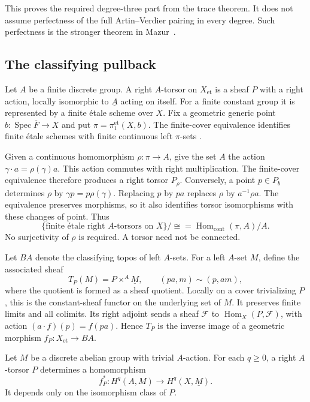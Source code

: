 This proves the required degree-three part from the trace theorem.  It
does not assume perfectness of the full Artin--Verdier pairing in every
degree.  Such perfectness is the stronger theorem in
Mazur~\cite[\S2, (2.4), pp.~538--539]{Mazur1973}.

\subsection{The classifying pullback}

Let \(A\) be a finite discrete group.  A right \(A\)-torsor on
\(X_{\mathrm{et}}\) is a sheaf \(P\) with a right action, locally
isomorphic to \(\underline A\) acting on itself.  For a finite constant
group it is represented by a finite \'etale scheme over \(X\).
Fix a geometric generic point \(b:\operatorname{Spec}\overline F\to X\)
and put \(\pi=\pi_1^{\mathrm{et}}(X,b)\).
The finite-cover equivalence identifies finite \'etale schemes with finite
continuous left \(\pi\)-sets
\cite[Theorem 58.6.2]{do26-StacksFundamental}.

Given a continuous homomorphism \(\rho:\pi\to A\), give the set
\(A\) the action \(\gamma\cdot a=\rho(\gamma)a\).
This action commutes with right multiplication.  The finite-cover
equivalence therefore produces a right torsor \(P_\rho\).
Conversely, a point \(p\in P_b\) determines \(\rho\) by
\(\gamma p=p\rho(\gamma)\).  Replacing \(p\) by \(pa\) replaces
\(\rho\) by \(a^{-1}\rho a\).  The equivalence preserves morphisms,
so it also identifies torsor isomorphisms with these changes of point.
Thus
\[
 \{\text{finite \'etale right }A\text{-torsors on }X\}/\cong
 =\operatorname{Hom}_{\mathrm{cont}}(\pi,A)/A.
\]
No surjectivity of \(\rho\) is required.  A torsor need not be connected.

Let \(BA\) denote the classifying topos of left \(A\)-sets.
For a left \(A\)-set \(M\), define the associated sheaf
\[
 T_P(M)=P\times^A\underline M,
 \qquad (pa,m)\sim(p,am),
\]
where the quotient is formed as a sheaf quotient.  Locally on a cover
trivializing \(P\), this is the constant-sheaf functor on the underlying
set of \(M\).  It preserves finite limits and all colimits.  Its right
adjoint sends a sheaf \(\mathcal F\) to
\(\operatorname{Hom}_X(P,\mathcal F)\), with action
\((a\cdot f)(p)=f(pa)\).  Hence \(T_P\) is the inverse image of a
geometric morphism \(f_P:X_{\mathrm{et}}\to BA\).

\begin{proposition}
\label{prop:do26-pullback}
Let \(M\) be a discrete abelian group with trivial \(A\)-action.
For each \(q\geq0\), a right \(A\)-torsor \(P\) determines a
homomorphism
\[
 f_P^*:H^q(A,M)\longrightarrow H^q(X,\underline M).
\]
It depends only on the isomorphism class of \(P\).
\end{proposition}

